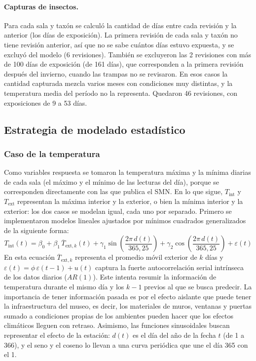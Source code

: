 \documentclass[11pt,a4paper]{article}
\begin{document}
\paragraph{Capturas de insectos.} Para cada sala y taxón se calculó la cantidad de días entre cada revisión y la anterior (los días de exposición). La primera revisión de cada sala y taxón no tiene revisión anterior, así que no se sabe cuántos días estuvo expuesta, y se excluyó del modelo (6 revisiones). También se excluyeron las 2 revisiones con más de 100 días de exposición (de 161 días), que corresponden a la primera revisión después del invierno, cuando las trampas no se revisaron. En esos casos la cantidad capturada mezcla varios meses con condiciones muy distintas, y la temperatura media del período no la representa. Quedaron 46 revisiones, con exposiciones de 9 a 53 días.

\subsection{Estrategia de modelado estadístico}
\subsubsection{Caso de la temperatura}
Como variables respuesta se tomaron la temperatura máxima y la mínima diarias de cada sala (el máximo y el mínimo de las lecturas del día), porque se corresponden directamente con las que publica el SMN. En lo que sigue, $T_{\text{int}}$ y $T_{\text{ext}}$ representan la máxima interior y la exterior, o bien la mínima interior y la exterior: los dos casos se modelan igual, cada uno por separado. Primero se implementaron modelos lineales ajustados por mínimos cuadrados generalizados de la siguiente forma:
\begin{equation}
    T_{\text{int}}(t) = \beta_0 + \beta_1 \, \overline{T}_{\text{ext}, k}(t) + \gamma_1 \sin\left(\frac{2\pi\, d(t)}{365{,}25}\right) + \gamma_2 \cos\left(\frac{2\pi\, d(t)}{365{,}25}\right) + \varepsilon(t)
\end{equation}
En esta ecuación $\overline{T}_{\text{ext}, k}$ representa el promedio móvil exterior de $k$ días y $\varepsilon(t) = \phi \, \varepsilon(t-1) + u(t)$ captura la fuerte autocorrelación serial intrínseca de los datos diarios ($AR(1)$). Este intenta resumir la información de temperatura durante el mismo día y los $k-1$ previos al que se busca predecir. La importancia de tener información pasada es por el efecto aislante que puede tener la infraestructura del museo, es decir, los materiales de muros, ventanas y puertas sumado a condiciones propias de los ambientes pueden hacer que los efectos climáticos lleguen con retraso. Asimismo, las funciones sinusoidales buscan representar el efecto de la estación: $d(t)$ es el día del año de la fecha $t$ (de 1 a 366), y el seno y el coseno lo llevan a una curva periódica que une el día 365 con el 1.
\end{document}
